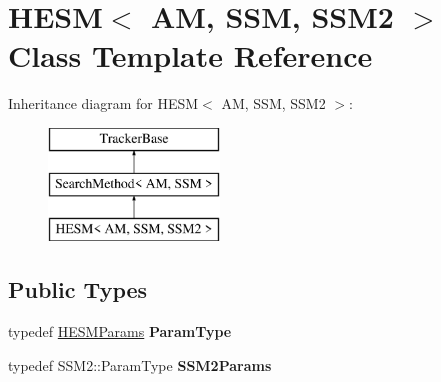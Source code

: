 \hypertarget{classHESM}{\section{H\-E\-S\-M$<$ A\-M, S\-S\-M, S\-S\-M2 $>$ Class Template Reference}
\label{classHESM}
}
Inheritance diagram for H\-E\-S\-M$<$ A\-M, S\-S\-M, S\-S\-M2 $>$\-:\begin{figure}[H]
\begin{center}
\leavevmode
\includegraphics[height=3.000000cm]{classHESM}
\end{center}
\end{figure}
\subsection*{Public Types}
\begin{DoxyCompactItemize}
\item 
\hypertarget{classHESM_abf41db8320054f6d6832d01efa6ebf80}{typedef \hyperlink{structHESMParams}{H\-E\-S\-M\-Params} {\bfseries Param\-Type}}\label{classHESM_abf41db8320054f6d6832d01efa6ebf80}

\item 
\hypertarget{classHESM_af4b52c198e7fd03cee9524ae0d62fc7a}{typedef S\-S\-M2\-::\-Param\-Type {\bfseries S\-S\-M2\-Params}}\label{classHESM_af4b52c198e7fd03cee9524ae0d62fc7a}

\end{DoxyCompactItemize}
